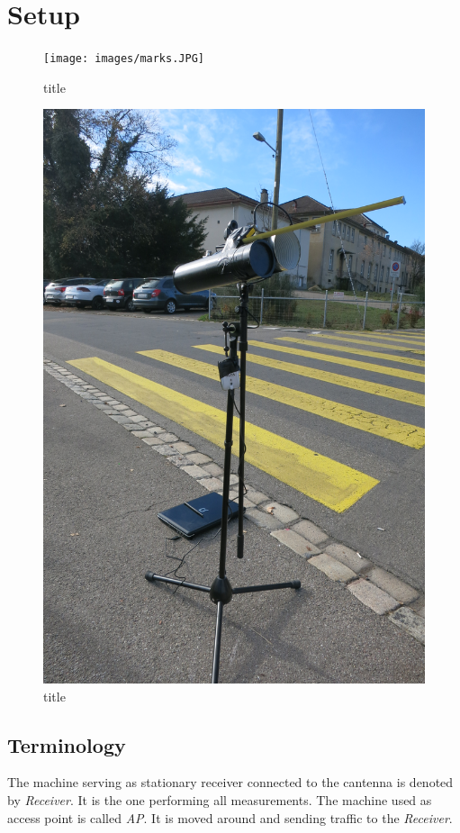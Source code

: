 \documentclass[12pt,a4paper]{article}
\newcommand{\rc}[0]{\emph{Receiver}}
\newcommand{\ap}[0]{\emph{AP}}
\begin{document}
\section{Setup}
	\begin{figure}
		\texttt{[image: images/marks.JPG]}
		\caption{title}
		\label{marks}
	\end{figure}
	\begin{figure}
		\includegraphics[angle=270,width=\textwidth]{images/setup.JPG}
		\caption{title}
		\label{setup}
	\end{figure}
	
	
	\subsection{Terminology}
		The machine serving as stationary receiver connected to the cantenna is denoted by \rc. It is the one performing all measurements. The machine used as access point is called \ap. It is moved around and sending traffic to the \rc.
	
\end{document}
